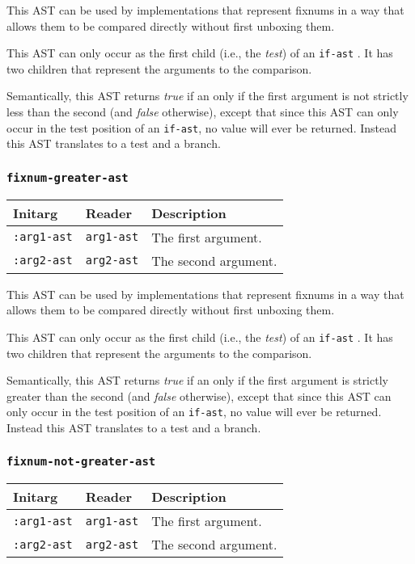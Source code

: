 This AST can be used by implementations that represent fixnums in a
way that allows them to be compared directly without first unboxing
them.

This AST can only occur as the first child (i.e., the \emph{test}) of
an \texttt{if-ast} .  It has two children that
represent the arguments to the comparison.  

Semantically, this AST returns \emph{true} if an only if the first
argument is not strictly less than the second (and \emph{false}
otherwise), except that since this AST can only occur in the test
position of an \texttt{if-ast}, no value will ever be returned.
Instead this AST translates to a test and a branch. 

\subsubsection{\texttt{fixnum-greater-ast}}
\label{fixnum-greater-ast}

\begin{tabular}{|l|l|l|}
\hline
Initarg & Reader & Description\\
\hline\hline
\texttt{:arg1-ast} & \texttt{arg1-ast} & The first argument.\\
\hline
\texttt{:arg2-ast} & \texttt{arg2-ast} & The second argument.\\
\hline
\end{tabular}

This AST can be used by implementations that represent fixnums in a
way that allows them to be compared directly without first unboxing
them.

This AST can only occur as the first child (i.e., the \emph{test}) of
an \texttt{if-ast} .  It has two children that
represent the arguments to the comparison.  

Semantically, this AST returns \emph{true} if an only if the first
argument is strictly greater than the second (and \emph{false}
otherwise), except that since this AST can only occur in the test
position of an \texttt{if-ast}, no value will ever be returned.
Instead this AST translates to a test and a branch. 

\subsubsection{\texttt{fixnum-not-greater-ast}}
\label{fixnum-not-greater-ast}

\begin{tabular}{|l|l|l|}
\hline
Initarg & Reader & Description\\
\hline\hline
\texttt{:arg1-ast} & \texttt{arg1-ast} & The first argument.\\
\hline
\texttt{:arg2-ast} & \texttt{arg2-ast} & The second argument.\\
\hline
\end{tabular}

